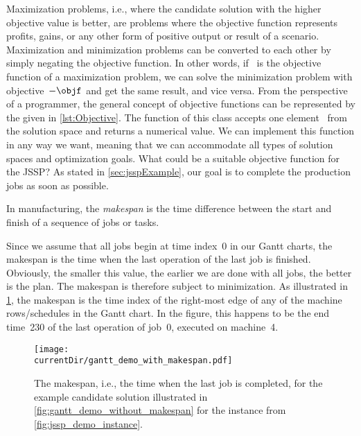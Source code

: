 Maximization problems, i.e., where the candidate solution with the higher objective value is better, are problems where the objective function represents profits, gains, or any other form of positive output or result of a scenario.
Maximization and minimization problems can be converted to each other by simply negating the objective function.
In other words, if \objf~is the objective function of a maximization problem, we can solve the minimization problem with objective~$-\objf$ and get the same result, and vice versa.%
%
\endhsection%
%
%
%
From the perspective of a programmer, the general concept of objective functions can be represented by the  given in \cref{lst:Objective}.
The  function of this class accepts one element~ from the solution space and returns a numerical value.
We can implement this function in any way we want, meaning that we can accommodate all types of solution spaces and optimization goals.%
%
%
%
\endhsection%
%
%
\label{sec:jsspObjectiveFunction}%
%
What could be a suitable objective function for the \gls{JSSP}?
As stated in \cref{sec:jsspExample}, our goal is to complete the production jobs as soon as possible.%
%
\begin{definition}[Makespan]%
\label{def:makespan}%
In manufacturing, the \emph{makespan} is the time difference between the start and finish of a sequence of jobs or tasks.%
\end{definition}%
%
Since we assume that all jobs begin at time index~0 in our Gantt charts, the makespan is the time when the last operation of the last job is finished.
Obviously, the smaller this value, the earlier we are done with all jobs, the better is the plan.
The makespan is therefore subject to minimization.
As illustrated in \cref{fig:gantt_demo_with_makespan}, the makespan is the time index of the right-most edge of any of the machine rows/schedules in the Gantt chart.
In the figure, this happens to be the end time~230 of the last operation of job~0, executed on machine~4.

\begin{figure}%
\centering%
\texttt{[image: \\currentDir/gantt\_demo\_with\_makespan.pdf]}%
\caption{The makespan, i.e., the time when the last job is completed, for the example candidate solution illustrated in \cref{fig:gantt_demo_without_makespan} for the  instance from \cref{fig:jssp_demo_instance}.}%
\label{fig:gantt_demo_with_makespan}%
\end{figure}

